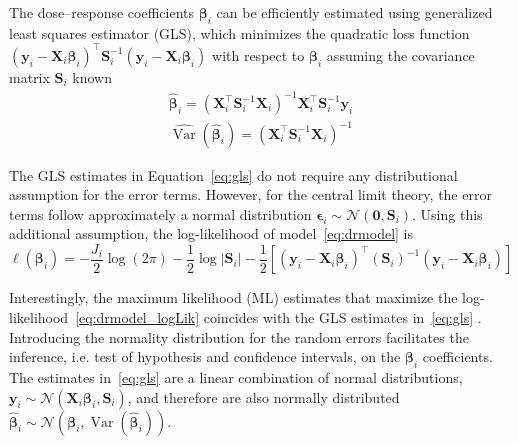 \documentclass[11pt,a4paper,twoside,openany]{book}\usepackage{knitr}
\DeclareMathOperator{\Var}{Var}
\begin{document}
{The dose--response coefficients $\boldsymbol{\beta}_i$ can be efficiently estimated using generalized least squares estimator (GLS), which minimizes the quadratic loss function $\left(\mathbf{y}_i- \mathbf{X}_i \boldsymbol{\beta}_i \right)^\top \mathbf{S}_i^{-1} \left(\mathbf{y}_i- \mathbf{X}_i \boldsymbol{\beta}_i \right)$ with respect to $\boldsymbol{\beta}_i$ assuming the covariance matrix $\mathbf{S}_i$ known
\begin{equation}
\begin{gathered}
\boldsymbol{\hat \beta}_i = ( \mathbf{X}_i^\top  \mathbf{S}_i^{-1} \mathbf{X}_i)^{-1} \mathbf{X}_i^\top  \mathbf{S}_i^{-1} \mathbf{y}_i \\ 
\widehat{\Var} \left( \boldsymbol{\hat \beta}_i \right) = ( \mathbf{X}_i^\top \mathbf{S}_i^{-1} \mathbf{X}_i)^{-1}
\end{gathered}
\label{eq:gls}
\end{equation}

\noindent The GLS estimates in Equation~\ref{eq:gls} do not require any distributional assumption for the error terms. However, for the central limit theory, the error terms follow approximately a normal distribution $\boldsymbol{\epsilon}_i \sim \mathcal{N}\left(\mathbf{0}, \mathbf{S}_i \right)$. 
Using this additional assumption, the log-likelihood of model~\ref{eq:drmodel} is
\begin{equation}
\ell\left(\boldsymbol{\beta}_i\right) = -\frac{J_i}{2}\log\left(2\pi\right) - \frac{1}{2}\log|\mathbf{S}_i| - \frac{1}{2} \left[\left(\mathbf{y}_i- \mathbf{X}_i \boldsymbol{\beta}_i \right)^\top \left( \mathbf{S}_i \right)^{-1} \left(\mathbf{y}_i- \mathbf{X}_i \boldsymbol{\beta}_i \right) \right]
\label{eq:drmodel_logLik}
\end{equation}

\noindent Interestingly, the maximum likelihood (ML) estimates that maximize the log-likelihood~\ref{eq:drmodel_logLik} coincides with the GLS estimates in~\ref{eq:gls} \citep{orsini2006generalized}. Introducing the normality distribution for the random errors facilitates the inference, i.e. test of hypothesis and confidence intervals, on the $\boldsymbol{\beta}_i$ coefficients. The estimates in~\ref{eq:gls} are a linear combination of normal distributions, $\mathbf{y}_i \sim \mathcal{N}\left(\mathbf{X}_i \boldsymbol{\beta}_i, \mathbf{S}_i \right)$, and therefore are also normally  distributed $\boldsymbol{\hat \beta}_i \sim \mathcal{N}\left( \boldsymbol{\beta}_i, {\Var} \left( \boldsymbol{\hat \beta}_i \right)\right)$.

}
\end{document}
